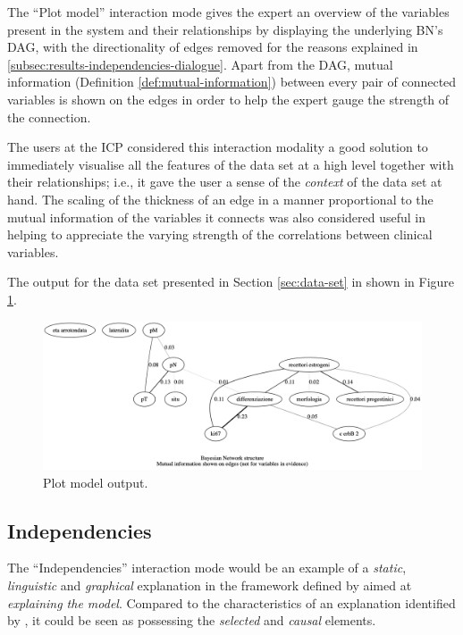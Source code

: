 The \enquote{Plot model} interaction mode gives the expert an overview of the variables present in the system and their relationships by displaying the underlying BN's DAG, with the directionality of edges removed for the reasons explained in \ref{subsec:results-independencies-dialogue}.
Apart from the DAG, mutual information (Definition \ref{def:mutual-information}) between every pair of connected variables is shown on the edges in order to help the expert gauge the strength of the connection.

The users at the ICP considered this interaction modality a good solution to immediately visualise all the features of the data set at a high level together with their relationships; i.e., it gave the user a sense of the \textit{context} of the data set at hand. 
The scaling of the thickness of an edge in a manner proportional to the mutual information of the variables it connects was also considered useful in helping to appreciate the varying strength of the correlations between clinical variables.

The output for the data set presented in Section \ref{sec:data-set} in shown in Figure \ref{fig:sw_plot_result}.

\begin{figure}[htbp]
\centerline{\includegraphics[width=\textwidth]{results/images/plot_result}}
\caption{Plot model output.}
\label{fig:sw_plot_result}
\end{figure}

\subsection{Independencies} \label{subsec:results-independencies-query}
The \enquote{Independencies} interaction mode would be an example of a \textit{static}, \textit{linguistic} and \textit{graphical} explanation in the framework defined by \citet{lacave2002review} aimed at \textit{explaining the model}.
Compared to the characteristics of an explanation identified by \citet{miller2018explanation}, it could be seen as possessing the \textit{selected} and \textit{causal} elements.

